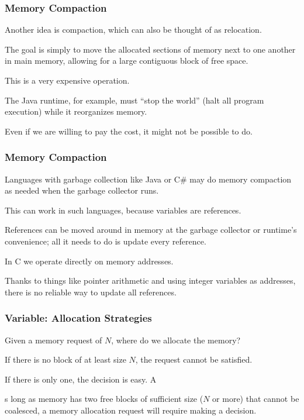 \begin{frame}
\frametitle{Memory Compaction}

Another idea is \alert{compaction}, which can also be thought of as \alert{relocation}. 

The goal is simply to move the allocated sections of memory next to one another in main memory, allowing for a large contiguous block of free space. 

This is a very expensive operation. 

The Java runtime, for example, must ``stop the world'' (halt all program execution) while it reorganizes memory. 

Even if we are willing to pay the cost, it might not be possible to do.

\end{frame}

\begin{frame}
\frametitle{Memory Compaction}

Languages with garbage collection like Java or C\# may do memory compaction as needed when the garbage collector runs.

This can work in such languages, because variables are references.

References can be moved around in memory at the garbage collector or runtime's convenience; all it needs to do is update every reference.

In C we operate directly on memory addresses. 

Thanks to things like pointer arithmetic and using integer variables as addresses, there is no reliable way to update all references.


\end{frame}

\begin{frame}
\frametitle{Variable: Allocation Strategies}

Given a memory request of $N$, where do we allocate the memory? 

If there is no block of at least size $N$, the request cannot be satisfied. 

If there is only one, the decision is easy. A

s long as memory has two free blocks of sufficient size ($N$ or more) that cannot be coalesced, a memory allocation request will require making a decision.


\end{frame}

